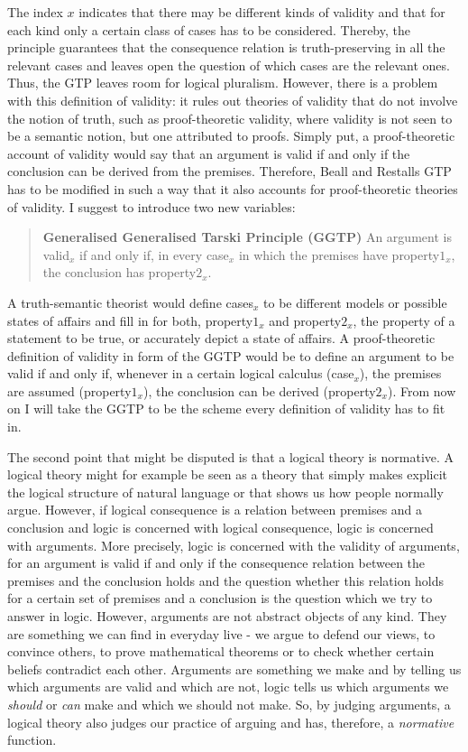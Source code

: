 \documentclass{article}
\begin{document}
The index $x$ indicates that there may be different kinds of validity and that for each kind only a certain class of cases has to be considered. Thereby, the principle guarantees that the consequence relation is truth-preserving in all the relevant cases and leaves open the question of which cases are the relevant ones. Thus, the GTP leaves room for logical pluralism. %
However, there is a problem with this definition of validity: it rules out theories of validity that do not involve the notion of truth, such as proof-theoretic validity, where validity is not seen to be a semantic notion, but one attributed to proofs. Simply put, a proof-theoretic account of validity would say that an argument is valid if and only if the conclusion can be derived from the premises. Therefore, Beall and Restalls GTP has to be modified in such a way that it also accounts for proof-theoretic theories of validity. I suggest to introduce two new variables:

\begin{quote}
\textbf{Generalised Generalised Tarski Principle (GGTP)} An argument is valid$_x$ if and only if, in every case$_x$ in which the premises have property$1_x$, the conclusion has property$2_x$. \label{principle:GGTP}
\end{quote}

A truth-semantic theorist would define cases$_x$ to be different models or possible states of affairs and fill in for both, property$1_x$ and property$2_x$, the property of a statement to be true, or accurately depict a state of affairs. A proof-theoretic definition of validity in form of the GGTP would be to define an argument to be valid if and only if, whenever in a certain logical calculus (case$_x$), the premises are assumed (property$1_x$), the conclusion can be derived (property$2_x$). From now on I will take the GGTP to be the scheme every definition of validity has to fit in.

The second point that might be disputed is that a logical theory is normative. A logical theory might for example be seen as a theory that simply makes explicit the logical structure of natural language or that shows us how people normally argue. However, if logical consequence is a relation between premises and a conclusion and logic is concerned with logical consequence, logic is concerned with arguments. More precisely, logic is concerned with the validity of arguments, for an argument is valid if and only if the consequence relation between the premises and the conclusion holds and the question whether this relation holds for a certain set of premises and a conclusion is the question which we try to answer in logic. However, arguments are not abstract objects of any kind. They are something we can find in everyday live - we argue to defend our views, to convince others, to prove mathematical theorems or to check whether certain beliefs contradict each other. Arguments are something we make and by telling us which arguments are valid and which are not, logic tells us which arguments we \textit{should} or \textit{can} make and which we should not make. So, by judging arguments, a logical theory also judges our practice of arguing and has, therefore, a \textit{normative} function.
\end{document}
